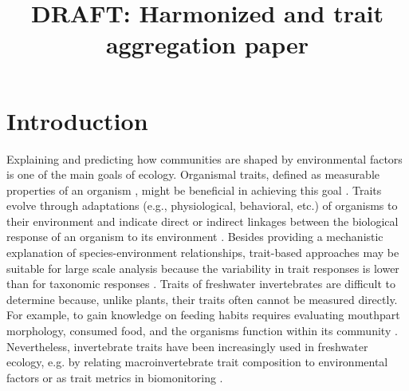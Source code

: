 \documentclass{article}
\title{DRAFT: Harmonized and trait aggregation paper }
\author{}%
\date{}
\begin{document}
\maketitle

\section*{Introduction}

Explaining and predicting how communities are shaped by environmental factors is one of the main goals of ecology. Organismal traits, defined as measurable properties of an organism \cite{mcgill_rebuilding_2006}, might be beneficial in achieving this goal \cite{heino_jani_macroecological_2013}. Traits evolve through adaptations (e.g., physiological, behavioral, etc.) of organisms to their environment and indicate direct or indirect linkages between the biological response of an organism to its environment \cite{southwood_habitat_1977, verberk_delivering_2013}. Besides providing a mechanistic explanation of species-environment relationships, trait-based approaches may be suitable for large scale analysis because the variability in trait responses is lower than for taxonomic responses \cite{bonada_taxonomic_2007, baird_toward_2011}. Traits of freshwater invertebrates are difficult to determine because, unlike plants, their traits often cannot be measured directly. For example, to gain knowledge on feeding habits requires evaluating mouthpart morphology, consumed food, and the organisms function within its community \cite{moog_comprehensive_nodate}. Nevertheless, invertebrate traits have been increasingly used in freshwater ecology, e.g. by relating macroinvertebrate trait composition to environmental factors or as trait metrics in biomonitoring \cite{poff_developing_2010, szocs_effects_2014, bhowmik_large_2015, menezes_beyond_2010}.

\end{document}
